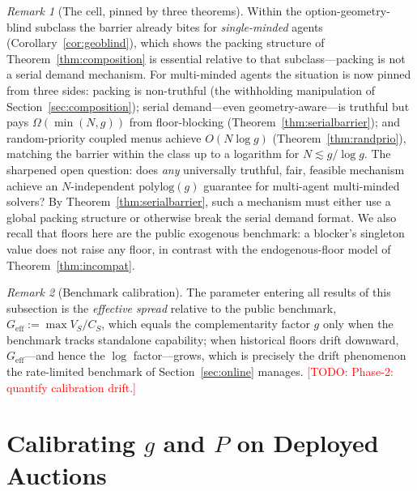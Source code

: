 \documentclass[11pt]{article}
\newcommand{\todo}[1]{\textcolor{red}{[TODO: #1]}}
\theoremstyle{remark}
\newtheorem{remark}{Remark}
\begin{document}
\begin{remark}[The cell, pinned by three theorems]\label{rem:pinned}
Within the option-geometry-blind subclass the barrier already bites for
\emph{single-minded} agents (Corollary~\ref{cor:geoblind}), which shows
the packing structure of Theorem~\ref{thm:composition} is essential
relative to that subclass---packing is not a serial demand mechanism. For
multi-minded agents the situation is now pinned from three sides: packing
is non-truthful (the withholding manipulation of
Section~\ref{sec:composition}); serial demand---even geometry-aware---is
truthful but pays $\Omega(\min(N,g))$ from floor-blocking
(Theorem~\ref{thm:serialbarrier}); and random-priority coupled menus
achieve $O(N\log g)$ (Theorem~\ref{thm:randprio}), matching the barrier
within the class up to a logarithm for $N\lesssim g/\log g$. The sharpened
open question: does \emph{any} universally truthful, fair, feasible
mechanism achieve an $N$-independent $\mathrm{polylog}(g)$ guarantee for
multi-agent multi-minded solvers? By Theorem~\ref{thm:serialbarrier},
such a mechanism must either use a global packing structure or otherwise
break the serial demand format. We also recall that floors here are the
public exogenous benchmark: a blocker's singleton value does not raise any
floor, in contrast with the endogenous-floor model of
Theorem~\ref{thm:incompat}.
\end{remark}

\begin{remark}[Benchmark calibration]\label{conj:composition}
The parameter entering all results of this subsection is the
\emph{effective spread}
relative to the public benchmark, $G_{\mathrm{eff}}:=\max V_S/C_S$, which
equals the complementarity factor $g$ only when the benchmark tracks
standalone capability; when historical floors drift downward,
$G_{\mathrm{eff}}$---and hence the $\log$ factor---grows, which is
precisely the drift phenomenon the rate-limited benchmark of
Section~\ref{sec:online} manages. \todo{Phase-2: quantify calibration drift.}
\end{remark}

\section{Calibrating \texorpdfstring{$g$ and $P$}{g and P} on Deployed Auctions}\label{sec:empirics}
\end{document}

